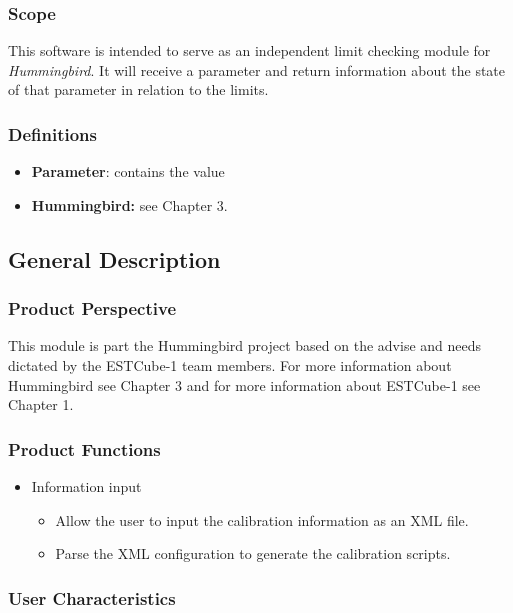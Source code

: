 \subsubsection{Scope}

This software is intended to serve as an independent limit checking module for \emph{Hummingbird}. It will receive a parameter and return information about the state of that parameter in relation to the limits.

\subsubsection{Definitions}

\begin{itemize}
\item \textbf{Parameter}: contains the value 
\item \textbf{Hummingbird:} see Chapter 3.
\end{itemize}

\subsection{General Description}
\subsubsection{Product Perspective}

This module is part the Hummingbird project based on the advise and needs dictated by the ESTCube-1 team members. For more information about Hummingbird see Chapter 3 and for more information about ESTCube-1 see Chapter 1. 

\subsubsection{Product Functions}

\begin{itemize}
\item Information input
\begin{itemize}
\item Allow the user to input the calibration information as an XML file.
\item Parse the XML configuration to generate the calibration scripts.
\end{itemize}


\end{itemize}

\subsubsection{User Characteristics}

